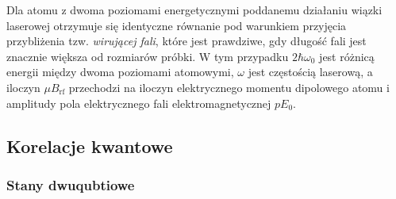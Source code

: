 \documentclass{myclass}
\begin{document}
Dla atomu z dwoma poziomami energetycznymi poddanemu działaniu wiązki laserowej otrzymuje się
identyczne równanie pod warunkiem przyjęcia przybliżenia tzw. \textit{wirującej fali}, które jest
prawdziwe, gdy długość fali jest znacznie większa od rozmiarów próbki. W tym przypadku
\(2\hbar\omega_0\) jest różnicą energii między dwoma poziomami atomowymi, \(\omega\) jest częstością
laserową, a iloczyn \(\mu B_\text{rf}\) przechodzi na iloczyn elektrycznego momentu dipolowego atomu
i amplitudy pola elektrycznego fali elektromagnetycznej \(p E_0\).

\subsection{Korelacje kwantowe}

\subsubsection{Stany dwuqubtiowe}
\end{document}
